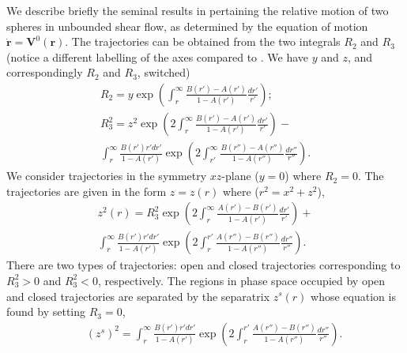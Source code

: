 We describe briefly the seminal results in \cite{batchelor_green_1972} pertaining the relative motion of two spheres in unbounded shear flow, as determined by the equation of motion $\dot{\bm r}=\bm V^0(\bm r)$. The trajectories can be obtained from the two integrals $R_2$ and $R_3$ (notice a different labelling of the axes compared to \cite{batchelor_green_1972}. We have $y$ and $z$, and correspondingly $R_2$ and $R_3$, switched)
\begin{equation} \begin{aligned}  %
R_2=y\exp\left(\int_r^{\infty}\frac{B(r')-A(r')}{1-A(r')}\frac{dr'}{r'}\right);\\
R_3^2%
%
=z^2\exp\left(2\int_r^{\infty}\frac{B(r')-A(r')}{1-A(r')}\frac{dr'}{r'}\right)  %
- \\ \!\int_r^{\infty}\!\!\!\frac{B(r')r'dr'}{1\!-\!A(r')}\exp\left(2\int_{r'}^{\infty}\frac{B(r'')\!-\!A(r'')}{1\!-\!A(r'')}\frac{dr''}{r''}\right).
\end{aligned} \end{equation}
We consider trajectories in the symmetry $xz$-plane ($y=0$) where $R_2=0$. The trajectories are given in the form $z=z(r)$ where ($r^2=x^2+z^2$),
\begin{equation} \begin{aligned}   %
z^2(r)=
R_3^2\exp \left(2\int_r^{\infty}\frac{A(r')-B(r')}{1-A(r')}\frac{dr'}{r'}\right)
\!+ \\  \!\int_r^{\infty}\!\!\!\frac{B(r')r'dr'}{1\!-\!A(r')}\exp\left(2\int_r^{r'}\frac{A(r'')\!-\!B(r'')}{1\!-\!A(r'')}\frac{dr''}{r''}\right).
\end{aligned} \end{equation} %
There are two types of trajectories: open and closed trajectories corresponding to $R_3^2>0$ and $R_3^2<0$, respectively. The regions in phase space occupied by open and closed trajectories are separated by the separatrix $z^s(r)$ whose equation is found by setting $R_3=0$,
\begin{eqnarray}&&\!\!\!\!\!\!\!\!\!\!\!\!\!\!
(z^s)^2\!=\!\!\!\int_r^{\infty}\!\!\!\frac{B(r')r'dr'}{1\!-\!A(r')}\exp\left(\!2\!\!\int_r^{r'}\!\!\!\frac{A(r'')\!-\!B(r'')}{1\!-\!A(r'')}\frac{dr''}{r''}\right).\label{separ}
\end{eqnarray}
